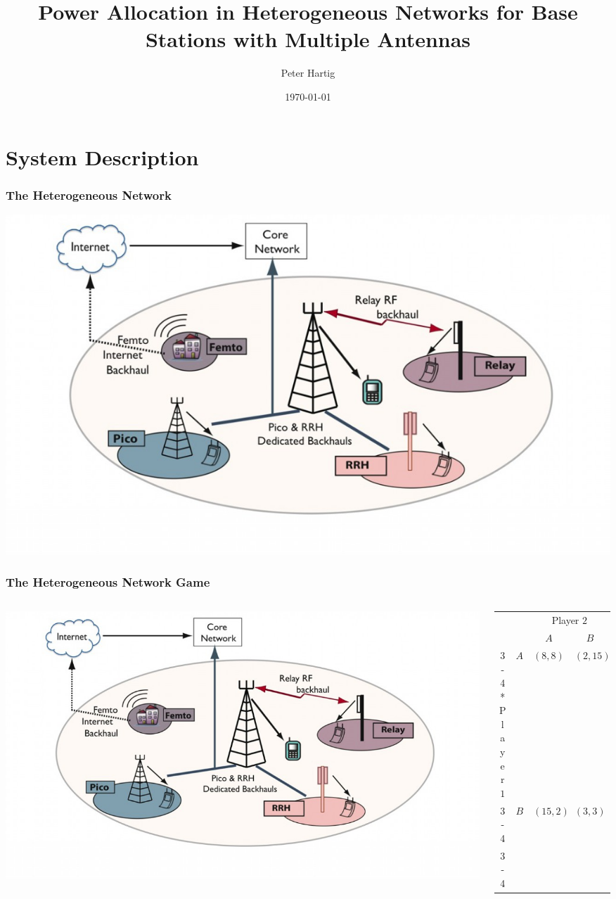 \documentclass[10pt,tgadventor, onlymath]{beamer}
\title{\large \bfseries Power Allocation in Heterogeneous Networks for Base Stations with Multiple Antennas}
\author{Peter Hartig\\[3ex]
}
\date{\today}
\begin{document}
\frame{
\thispagestyle{empty}
\titlepage
}

\section{System Description}
\begin{frame}
\frametitle{The Heterogeneous Network}
	\includegraphics[width=\textwidth]{het_net}
\end{frame}


\begin{frame}
\frametitle{The Heterogeneous Network Game}
\begin{columns}

\begin{column}{0.5\linewidth}
	\includegraphics[width=\textwidth]{het_net}

\end{column}
\begin{column}{0.5\linewidth}
\begin{table}
    \setlength{\extrarowheight}{2pt}
    \begin{tabular}{cc|c|c|}
      & \multicolumn{1}{c}{} & \multicolumn{2}{c}{Player $2$}\\
      & \multicolumn{1}{c}{} & \multicolumn{1}{c}{$A$}  & \multicolumn{1}{c}{$B$} \\\cline{3-4}
      \multirow{2}*{Player $1$}  & $A$ & $(8,8)$ & $(2,15)$ \\\cline{3-4}
      & $B$ & $(15,2)$ & $(3,3)$ \\\cline{3-4}
    \end{tabular}
  \end{table}
\end{column}
\end{columns}

\end{frame}
\end{document}
